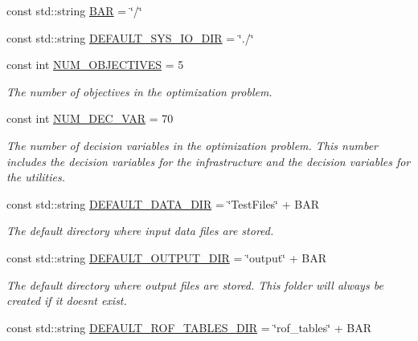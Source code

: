 \begin{DoxyCompactItemize}
\item 
const std\+::string \mbox{\hyperlink{classConstants_aaec5cbce5156ab790b3ae0563692fd92}{B\+AR}} = \char`\"{}/\char`\"{}
\item 
const std\+::string \mbox{\hyperlink{classConstants_aba68b8131899cf13623e86c9d409ba91}{D\+E\+F\+A\+U\+L\+T\+\_\+\+S\+Y\+S\+\_\+\+I\+O\+\_\+\+D\+IR}} = \char`\"{}./\char`\"{}
\item 
const int \mbox{\hyperlink{classConstants_a1e8f5e39c26fb06762a071611c7e432f}{N\+U\+M\+\_\+\+O\+B\+J\+E\+C\+T\+I\+V\+ES}} = 5
\begin{DoxyCompactList}\small\item\em The number of objectives in the optimization problem. \end{DoxyCompactList}\item 
const int \mbox{\hyperlink{classConstants_aa7919506e218b884dc934282a86594c1}{N\+U\+M\+\_\+\+D\+E\+C\+\_\+\+V\+AR}} = 70
\begin{DoxyCompactList}\small\item\em The number of decision variables in the optimization problem. This number includes the decision variables for the infrastructure and the decision variables for the utilities. \end{DoxyCompactList}\item 
const std\+::string \mbox{\hyperlink{classConstants_a236b0a1c5920895bf4bdf11191bf414d}{D\+E\+F\+A\+U\+L\+T\+\_\+\+D\+A\+T\+A\+\_\+\+D\+IR}} = \char`\"{}Test\+Files\char`\"{} + B\+AR
\begin{DoxyCompactList}\small\item\em The default directory where input data files are stored. \end{DoxyCompactList}\item 
const std\+::string \mbox{\hyperlink{classConstants_ad340f8cb6d76396687295b5fc306e058}{D\+E\+F\+A\+U\+L\+T\+\_\+\+O\+U\+T\+P\+U\+T\+\_\+\+D\+IR}} = \char`\"{}output\char`\"{} + B\+AR
\begin{DoxyCompactList}\small\item\em The default directory where output files are stored. This folder will always be created if it doesn\textquotesingle{}t exist. \end{DoxyCompactList}\item 
const std\+::string \mbox{\hyperlink{classConstants_a377a23d7faa55e3e687bd0b844c3d3e1}{D\+E\+F\+A\+U\+L\+T\+\_\+\+R\+O\+F\+\_\+\+T\+A\+B\+L\+E\+S\+\_\+\+D\+IR}} = \char`\"{}rof\+\_\+tables\char`\"{} + B\+AR

\end{DoxyCompactItemize}
